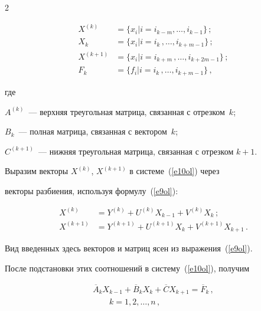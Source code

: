 \begin{multicols}{2}


\noindent


\begin{align*}


X^{(k)}& = \{x_i| i = i_{k-m},\ldots ,i_{k-1}\}\,;\\


X_k &= \{x_i| i = i_k\,,\ldots ,i_{k+m-1}\}\,;\\


X^{(k+1)} & = \{x_i| i = i_{k+m}\, ,\ldots ,i_{k+2m-1}\}\,;\\


F_k &= \{f_i| i = i_k\,, \ldots ,i_{k+m-1}\}\,,


\end{align*}


где


$A^{(k)}$~--- верхняя треугольная матрица, связанная с отрезком~$k$;


$B_k$~--- полная матрица, связанная с вектором~$k$;


$C^{(k+1)}$~--- нижняя треугольная матрица, связанная с отрезком $k + 1$.





     Выразим векторы $X^{(k)}$, $X^{(k+1)}$ в системе~(\ref{e10ol}) через


векторы разбиения, используя формулу~(\ref{e9ol}):


     \begin{align*}


     X^{(k)} & = Y^{(k)}+U^{(k)} X_{k-1} +V^{(k)} X_k\,;\\


     X^{(k+1)} & = Y^{(k+1)}+U^{(k+1)} X_{k} +V^{(k+1)} X_{k+1}\,.


     \end{align*}





     Вид введенных здесь векторов и матриц ясен из выражения~(\ref{e9ol}).


После подстановки этих соотношений в систему~(\ref{e10ol}), получим


     \begin{multline}


    \overline{A}_k X_{k-1} +\overline{B}_k X_k +\overline{C}X_{k+1} =


\overline{F}_k\,,\\


\ \ \ \ \ \ \ \ \ k=1, 2, \ldots , n\,,\label{e11ol}



\end{multline}
\end{multicols}
